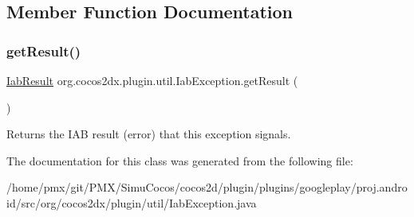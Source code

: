 \subsection{Member Function Documentation}
\mbox{\label{classorg_1_1cocos2dx_1_1plugin_1_1util_1_1IabException_ab7c7e5a8c0cbecfc90df970594f77c76}} 
\subsubsection{\texorpdfstring{get\+Result()}{getResult()}}
{\footnotesize\ttfamily \hyperlink{classorg_1_1cocos2dx_1_1plugin_1_1util_1_1IabResult}{Iab\+Result} org.\+cocos2dx.\+plugin.\+util.\+Iab\+Exception.\+get\+Result (\begin{DoxyParamCaption}{ }\end{DoxyParamCaption})\hspace{0.3cm}{\ttfamily [inline]}}

Returns the I\+AB result (error) that this exception signals. 

The documentation for this class was generated from the following file\+:\begin{DoxyCompactItemize}
\item 
/home/pmx/git/\+P\+M\+X/\+Simu\+Cocos/cocos2d/plugin/plugins/googleplay/proj.\+android/src/org/cocos2dx/plugin/util/Iab\+Exception.\+java\end{DoxyCompactItemize}
